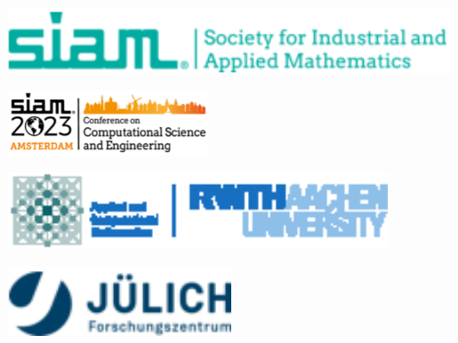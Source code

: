 \documentclass[25pt, a0paper,
portrait,
margin=2mm, 
innermargin=2mm, 
blockverticalspace=7mm, %
colspace=2mm, %
subcolspace=0mm]{tikzposter}
\begin{document}
\block{}
{
	\vspace{-0.6em}
	\begin{minipage}{0.2\textwidth}
		\begin{center}
			\includegraphics[width=0.99\textwidth]{./floats/logos/siam.eps}
		\end{center}
	\end{minipage}
	\hfill
	\begin{minipage}{0.2\textwidth}
		\begin{center}
			\includegraphics[width=0.45\textwidth]{./floats/logos/siamcse23.eps}
		\end{center}
	\end{minipage}
	\hfill
	\begin{minipage}{0.2\textwidth}
		\begin{center}
			\includegraphics[width=0.85\textwidth]{./floats/logos/acomrwth.eps}
		\end{center}
	\end{minipage}
	\hfill
	\begin{minipage}{0.2\textwidth}
		\begin{center}
			\includegraphics[width=0.5\textwidth]{./floats/logos/fzj.eps}
		\end{center}
	\end{minipage}
	\vspace{-0.6em}
}
\end{document}

